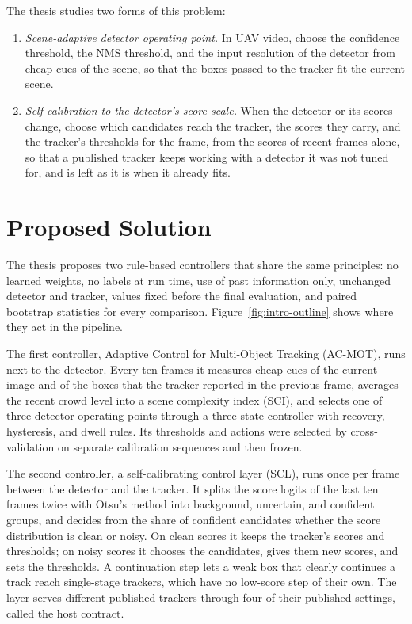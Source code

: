 The thesis studies two forms of this problem:
\begin{enumerate}
\item \emph{Scene-adaptive detector operating point.} In UAV video, choose the confidence threshold, the NMS threshold, and the input resolution of the detector from cheap cues of the scene, so that the boxes passed to the tracker fit the current scene.
\item \emph{Self-calibration to the detector's score scale.} When the detector or its scores change, choose which candidates reach the tracker, the scores they carry, and the tracker's thresholds for the frame, from the scores of recent frames alone, so that a published tracker keeps working with a detector it was not tuned for, and is left as it is when it already fits.
\end{enumerate}

\section{Proposed Solution}\label{sec:intro-solution}
The thesis proposes two rule-based controllers that share the same principles: no learned weights, no labels at run time, use of past information only, unchanged detector and tracker, values fixed before the final evaluation, and paired bootstrap statistics for every comparison. Figure~\ref{fig:intro-outline} shows where they act in the pipeline.

The first controller, Adaptive Control for Multi-Object Tracking (AC-MOT), runs next to the detector. Every ten frames it measures cheap cues of the current image and of the boxes that the tracker reported in the previous frame, averages the recent crowd level into a scene complexity index (SCI), and selects one of three detector operating points through a three-state controller with recovery, hysteresis, and dwell rules. Its thresholds and actions were selected by cross-validation on separate calibration sequences and then frozen.

The second controller, a self-calibrating control layer (SCL), runs once per frame between the detector and the tracker. It splits the score logits of the last ten frames twice with Otsu's method \cite{otsu1979} into background, uncertain, and confident groups, and decides from the share of confident candidates whether the score distribution is clean or noisy. On clean scores it keeps the tracker's scores and thresholds; on noisy scores it chooses the candidates, gives them new scores, and sets the thresholds. A continuation step lets a weak box that clearly continues a track reach single-stage trackers, which have no low-score step of their own. The layer serves different published trackers through four of their published settings, called the host contract.

